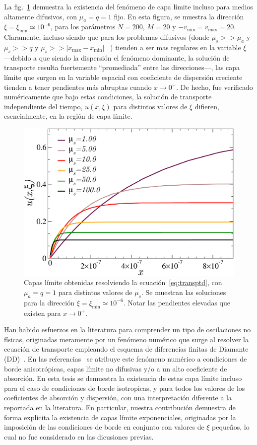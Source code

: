 La fig.~\ref{fig:blayers} demuestra la existencia del fenómeno 
de capa límite incluso para medios altamente difusivos, con 
$\mu_a=q=1$ fijo. En esta figura, se muestra la dirección 
$\xi=\xi_{\text{min}}\simeq 10^{-6}$, para los parámetros 
$N=200$, $M=20$ y $-v_{\text{min}}=v_{\text{max}}=20$. 
Claramente, incluso siendo que para los problemas difusivos 
(donde $\mu_s>>\mu_a$ y $\mu_s>>q$ y $\mu_s>>|x_{\text{max}}-x_{\text{min}}|$~ 
\cite{Larsen1987}) tienden a ser mas regulares en la variable $\xi$ 
---debido a que siendo la dispersión el fenómeno dominante, 
la solución de transporte resulta fuertemente ``promediada'' entre las direcciones---, 
las capa límite que surgen en la variable espacial con coeficiente 
de dispersión creciente tienden a tener pendientes más abruptas 
cuando $x\to 0^+$. De hecho, fue verificado numéricamente que bajo estas condiciones, 
la solución de transporte independiente del tiempo, $u(x,\xi)$ 
para distintos valores de $\xi$ difieren, esencialmente, en la región 
de capa límite.
\begin{figure}[h!]
\centering
  \includegraphics[width=0.5\linewidth]{figuras/blayers.pdf}
  \caption{Capas límite obtenidas resolviendo la ecuación~\eqref{eq:transptd}, 
  con $\mu_a=q=1$ para distintos valores de $\mu_s$. 
  Se muestran las soluciones para la dirección $\xi=\xi_{\text{min}} \simeq 10^{-6}$. 
  Notar las pendientes elevadas que existen para $x\to 0^+$.}
 \label{fig:blayers}
\end{figure}
Han habido esfuerzos en la literatura para comprender un tipo 
de oscilaciones no físicas, originadas 
meramente por un fenómeno numérico que 
surge al resolver la ecuación de transporte 
empleando el esquema de diferencias finitas de Diamante (DD)~\cite{Larsen1987,Petrovic1996,Bal2001}.
En las referencias~\cite{Larsen1987,Petrovic1996} se atribuye 
este fenómeno numérico a condiciones de borde anisotrópicas, capas límite no difusivas y/o 
a un alto coeficiente de absorción. En esta tesis 
se demuestra la existencia de estas capa límite incluso para el 
caso de condiciones de borde isotropicas, y para todos los valores 
de los coeficientes de absorción y dispersión, con una interpretación 
diferente a la reportada en la literatura. En particular, 
nuestra contribución demuestra de forma explícita la existencia 
de capas límite exponenciales, originadas por la imposición 
de las condiciones de borde en conjunto con valores de  $\xi$ 
pequeños, lo cual no fue considerado en las dicusiones previas.

